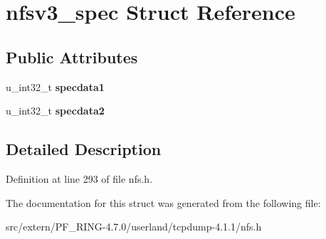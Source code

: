 \hypertarget{structnfsv3__spec}{
\section{nfsv3\_\-spec Struct Reference}
\label{structnfsv3__spec}
}
\subsection*{Public Attributes}
\begin{DoxyCompactItemize}
\item 
\hypertarget{structnfsv3__spec_af5b1d21c1b49b1e795f0cd9c296568aa}{
u\_\-int32\_\-t {\bfseries specdata1}}
\label{structnfsv3__spec_af5b1d21c1b49b1e795f0cd9c296568aa}

\item 
\hypertarget{structnfsv3__spec_a93a45a89e298af3e2fa0791474b69ca9}{
u\_\-int32\_\-t {\bfseries specdata2}}
\label{structnfsv3__spec_a93a45a89e298af3e2fa0791474b69ca9}

\end{DoxyCompactItemize}


\subsection{Detailed Description}


Definition at line 293 of file nfs.h.



The documentation for this struct was generated from the following file:\begin{DoxyCompactItemize}
\item 
src/extern/PF\_\-RING-\/4.7.0/userland/tcpdump-\/4.1.1/nfs.h\end{DoxyCompactItemize}

